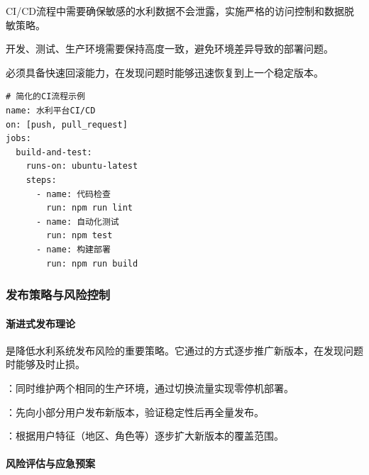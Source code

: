 
CI/CD流程中需要确保敏感的水利数据不会泄露，实施严格的访问控制和数据脱敏策略。


开发、测试、生产环境需要保持高度一致，避免环境差异导致的部署问题。


必须具备快速回滚能力，在发现问题时能够迅速恢复到上一个稳定版本。

\begin{lstlisting}
# 简化的CI流程示例
name: 水利平台CI/CD
on: [push, pull_request]
jobs:
  build-and-test:
    runs-on: ubuntu-latest
    steps:
      - name: 代码检查
        run: npm run lint
      - name: 自动化测试  
        run: npm test
      - name: 构建部署
        run: npm run build
\end{lstlisting}

\hypertarget{ux53d1ux5e03ux7b56ux7565ux4e0eux98ceux9669ux63a7ux5236}{%
\subsubsection{发布策略与风险控制}\label{ux53d1ux5e03ux7b56ux7565ux4e0eux98ceux9669ux63a7ux5236}}

\hypertarget{ux6e10ux8fdbux5f0fux53d1ux5e03ux7406ux8bba}{%
\paragraph{渐进式发布理论}\label{ux6e10ux8fdbux5f0fux53d1ux5e03ux7406ux8bba}}

是降低水利系统发布风险的重要策略。它通过的方式逐步推广新版本，在发现问题时能够及时止损。


：同时维护两个相同的生产环境，通过切换流量实现零停机部署。

：先向小部分用户发布新版本，验证稳定性后再全量发布。

：根据用户特征（地区、角色等）逐步扩大新版本的覆盖范围。

\hypertarget{ux98ceux9669ux8bc4ux4f30ux4e0eux5e94ux6025ux9884ux6848}{%
\paragraph{风险评估与应急预案}\label{ux98ceux9669ux8bc4ux4f30ux4e0eux5e94ux6025ux9884ux6848}}

